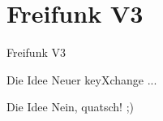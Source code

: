 \section{Freifunk V3}

\begin{frame}{}
    \begin{center}
        Freifunk V3
     \end{center}
\end{frame}

\begin{frame}{Die Idee}
    Neuer keyXchange ...
\end{frame}

\begin{frame}{Die Idee}
    Nein, quatsch! ;)
\end{frame}
